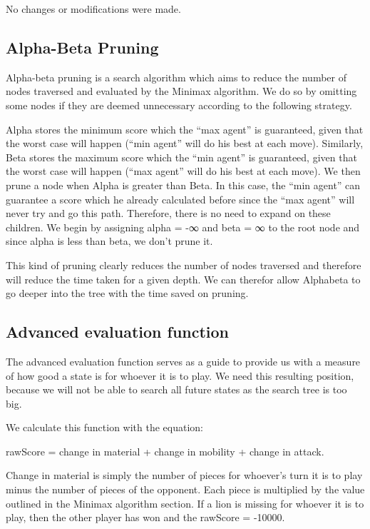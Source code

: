 \documentclass[twocolumn]{article}
\begin{document}
No changes or modifications were made.


\subsection{Alpha-Beta Pruning}

Alpha-beta pruning is a search algorithm which aims to reduce the number of nodes traversed and evaluated by the Minimax algorithm. We do so by omitting some nodes if they are deemed unnecessary according to the following strategy.

Alpha stores the minimum score which the “max agent” is guaranteed, given that the worst case will happen (“min agent” will do his best at each move). Similarly, Beta stores the maximum score which the “min agent” is guaranteed, given that the worst case will happen (“max agent” will do his best at each move). We then prune a node when Alpha is greater than Beta. In this case, the “min agent” can guarantee a score which he already calculated before since the “max agent” will never try and go this path. Therefore, there is no need to expand on these children. We begin by assigning alpha = -∞ and beta = ∞ to the root node and since alpha is less than beta, we don't prune it.

This kind of pruning clearly reduces the number of nodes traversed and therefore will reduce the time taken for a given depth. We can therefor allow Alphabeta to go deeper into the tree with the time saved on pruning.


\subsection{Advanced evaluation function}

The advanced evaluation function serves as a guide to provide us with a measure of how good a state is for whoever it is to play. We need this resulting position, because we will not be able to search all future states as the search tree is too big. 

We calculate this function with the equation:

rawScore = change in material + change in mobility + change in attack. 

Change in material is simply the number of pieces for whoever’s turn it is to play minus the number of pieces of the opponent. Each piece is multiplied by the value outlined in the Minimax algorithm section. If a lion is missing for whoever it is to play, then the other player has won and the rawScore = -10000.
\end{document}
